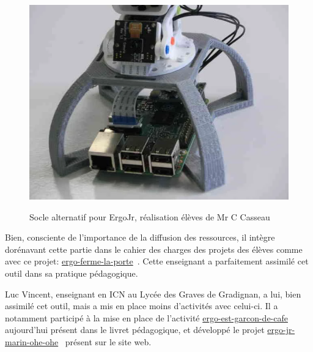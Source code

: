 \begin{figure}[!h]
                \hfill
                \begin{minipage}{0.315\linewidth}
                    \centering
                    \includegraphics[width=\linewidth]{Figures/CC-socle.png}
                    \label{fig:socle_real}
                \end{minipage}
                \caption[Socle alternatif pour ErgoJr]{Socle alternatif pour ErgoJr, réalisation élèves de Mr C Casseau~}\label{fig:socle}
                \end{figure}\par%
            Bien, consciente de l'importance de la diffusion des ressources, il intègre dorénavant cette partie dans le cahier des charges des projets des élèves comme avec ce projet: \href{https://www.poppy-education.org/2017/02/08/ergo-ferme-la-porte/}{ergo-ferme-la-porte}~. Cette enseignant a parfaitement assimilé cet outil dans sa pratique pédagogique.\par%
            Luc Vincent, enseignant en ICN au Lycée des Graves de Gradignan, a lui, bien assimilé cet outil, mais a mis en place moins d'activités avec celui-ci. Il a notamment participé à la mise en place de l'activité \href{https://www.poppy-education.org/2017/03/07/ergo-est-garcon-de-cafe/}{ergo-est-garcon-de-cafe}~ aujourd'hui présent dans le livret pédagogique, et développé le projet \href{https://www.poppy-education.org/2017/12/29/ergo-jr-marin-ohe-ohe/}{ergo-jr-marin-ohe-ohe}~ présent sur le site web.\par%
